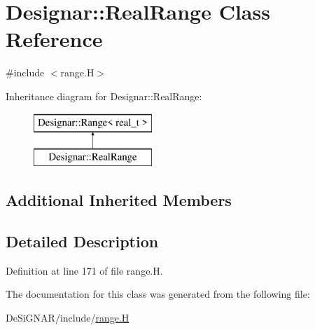 \hypertarget{class_designar_1_1_real_range}{}\section{Designar\+:\+:Real\+Range Class Reference}
\label{class_designar_1_1_real_range}


{\ttfamily \#include $<$range.\+H$>$}

Inheritance diagram for Designar\+:\+:Real\+Range\+:\begin{figure}[H]
\begin{center}
\leavevmode
\includegraphics[height=2.000000cm]{class_designar_1_1_real_range}
\end{center}
\end{figure}
\subsection*{Additional Inherited Members}


\subsection{Detailed Description}


Definition at line 171 of file range.\+H.



The documentation for this class was generated from the following file\+:\begin{DoxyCompactItemize}
\item 
De\+Si\+G\+N\+A\+R/include/\hyperlink{range_8_h}{range.\+H}\end{DoxyCompactItemize}

